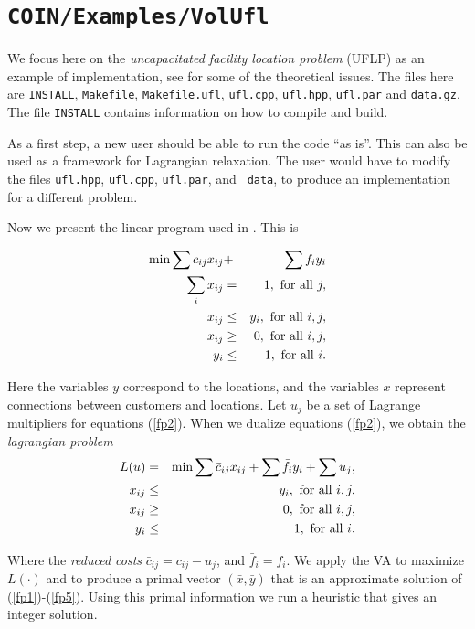 \documentclass{article}
\begin{document}
\section{{\tt COIN/Examples/VolUfl}}
We focus here on the {\it uncapacitated facility location
problem} (UFLP) as an example of implementation, see \cite{BC} for some of the theoretical
issues. The files here are {\tt INSTALL}, {\tt Makefile}, {\tt Makefile.ufl}, 
{\tt ufl.cpp}, {\tt ufl.hpp}, {\tt ufl.par} and {\tt data.gz}.
The file {\tt INSTALL} contains information on how to compile and build.

As a first step, a new user should be able to run the code ``as is''.
This can also be used as a framework for Lagrangian relaxation. The user would
have to modify the files {\tt ufl.hpp}, {\tt ufl.cpp}, {\tt ufl.par}, and {\tt
data}, to produce an implementation for a different problem.


Now we present the linear program used in \cite{BC}. This is

\pagebreak[4]
\begin{eqnarray}
\min \sum c_{ij} x_{ij} & + & \sum f_i y_i  \label{fp1} \\
\sum_i x_{ij} & = & 1, \hbox{ for all } j,  \label{fp2} \\
x_{ij} & \leq & y_i, \hbox{ for all } i, j, \label{fp3} \\
x_{ij} & \ge  & 0, \hbox{ for all } i, j,   \label{fp4} \\ 
y_i    & \le  & 1, \hbox{ for all } i.      \label{fp5}
\end{eqnarray}

Here the variables $y$ correspond to the locations, and the variables $x$
represent connections between customers and locations. Let $u_j$ be a set of
Lagrange multipliers for equations (\ref{fp2}). When we dualize equations
(\ref{fp2}), we obtain the {\it lagrangian problem}
\begin{eqnarray*}
L(u) & = & \min \sum \bar c_{ij} x_{ij} + \sum \bar f_i y_i + \sum u_j, \\
x_{ij} & \le & y_i, \hbox{ for all } i, j, \\
x_{ij} & \ge & 0, \hbox{ for all } i, j, \\
y_i    & \le & 1, \hbox{ for all } i.
\end{eqnarray*}

\noindent Where the {\it reduced costs} $\bar c_{ij}=c_{ij}-u_j$, and
$\bar f_i = f_i$. We apply the VA to maximize $L(\cdot)$ and to produce a
primal vector $(\bar x, \bar y)$ that is an approximate solution of
(\ref{fp1})-(\ref{fp5}). Using this primal information we run a heuristic
that gives an integer solution.
\end{document}

